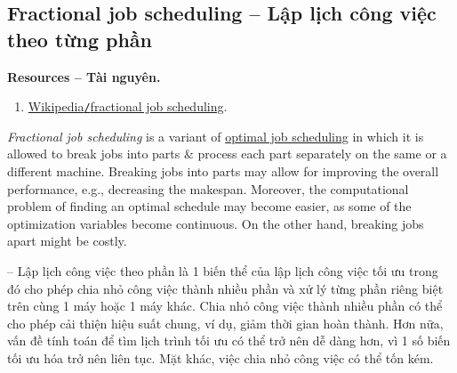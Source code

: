 \documentclass{article}
\begin{document}
\subsection{Fractional job scheduling -- Lập lịch công việc theo từng phần}
\textbf{\textbf{Resources -- Tài nguyên.}}
\begin{enumerate}
	\item \href{https://en.wikipedia.org/wiki/Fractional_job_scheduling}{Wikipedia{\tt/}fractional job scheduling}.
\end{enumerate}
{\it Fractional job scheduling} is a variant of \href{https://en.wikipedia.org/wiki/Optimal_job_scheduling}{optimal job scheduling} in which it is allowed to break jobs into parts \& process each part separately on the same or a different machine. Breaking jobs into parts may allow for improving the overall performance, e.g., decreasing the makespan. Moreover, the computational problem of finding an optimal schedule may become easier, as some of the optimization variables become continuous. On the other hand, breaking jobs apart might be costly.

-- Lập lịch công việc theo phần là 1 biến thể của lập lịch công việc tối ưu trong đó cho phép chia nhỏ công việc thành nhiều phần và xử lý từng phần riêng biệt trên cùng 1 máy hoặc 1 máy khác. Chia nhỏ công việc thành nhiều phần có thể cho phép cải thiện hiệu suất chung, ví dụ, giảm thời gian hoàn thành. Hơn nữa, vấn đề tính toán để tìm lịch trình tối ưu có thể trở nên dễ dàng hơn, vì 1 số biến tối ưu hóa trở nên liên tục. Mặt khác, việc chia nhỏ công việc có thể tốn kém.
\end{document}
